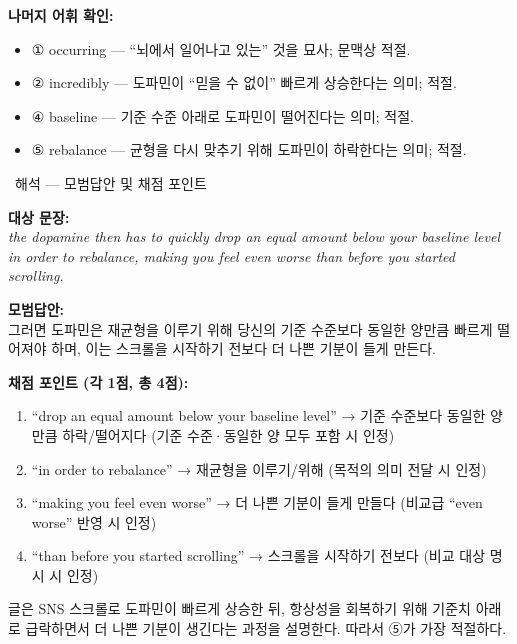 \documentclass[11pt,a4paper]{article}
\newcommand{\qno}[1]{\par\vspace{10pt}\noindent{\sffamily\bfseries #1.}\ }
\newcommand{\instr}[1]{{\sffamily #1}\par\vspace{3pt}}
\begin{document}
\vspace{4pt}\noindent\textbf{나머지 어휘 확인:}
\begin{itemize}[leftmargin=2em,itemsep=1pt,topsep=2pt]
  \item ① occurring — ``뇌에서 일어나고 있는'' 것을 묘사; 문맥상 적절.
  \item ② incredibly — 도파민이 ``믿을 수 없이'' 빠르게 상승한다는 의미; 적절.
  \item ④ baseline — 기준 수준 아래로 도파민이 떨어진다는 의미; 적절.
  \item ⑤ rebalance — 균형을 다시 맞추기 위해 도파민이 하락한다는 의미; 적절.
\end{itemize}

\qno{3}\instr{[서술형] 해석 — 모범답안 및 채점 포인트}

\noindent\textbf{대상 문장:}\\
\hspace{1em}\textit{the dopamine then has to quickly drop an equal amount below your baseline level in order to rebalance, making you feel even worse than before you started scrolling.}

\vspace{6pt}\noindent\textbf{모범답안:}\\
그러면 도파민은 재균형을 이루기 위해 당신의 기준 수준보다 동일한 양만큼 빠르게 떨어져야 하며, 이는 스크롤을 시작하기 전보다 더 나쁜 기분이 들게 만든다.

\vspace{6pt}\noindent\textbf{채점 포인트 (각 1점, 총 4점):}
\begin{enumerate}[leftmargin=2em,itemsep=2pt,topsep=2pt]
  \item ``drop an equal amount below your baseline level'' → 기준 수준보다 동일한 양만큼 하락/떨어지다 (기준 수준·동일한 양 모두 포함 시 인정)
  \item ``in order to rebalance'' → 재균형을 이루기/위해 (목적의 의미 전달 시 인정)
  \item ``making you feel even worse'' → 더 나쁜 기분이 들게 만들다 (비교급 ``even worse'' 반영 시 인정)
  \item ``than before you started scrolling'' → 스크롤을 시작하기 전보다 (비교 대상 명시 시 인정)
\end{enumerate}

\vspace{8pt}
\par 글은 SNS 스크롤로 도파민이 빠르게 상승한 뒤, 항상성을 회복하기 위해 기준치 아래로 급락하면서 더 나쁜 기분이 생긴다는 과정을 설명한다. 따라서 ⑤가 가장 적절하다.
\end{document}
